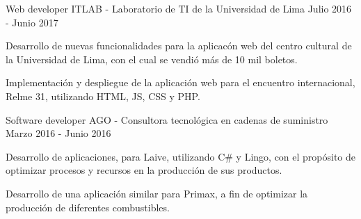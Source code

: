 \begin{cventries}
  \cventry
    {Web developer} %
    {ITLAB {\normalfont - Laboratorio de TI de la Universidad de Lima}} %
    {} %
    {Julio 2016 - Junio 2017} %
    {
      \begin{cvitems} %
        \item {Desarrollo de nuevas funcionalidades para la aplicacón web del centro cultural de la Universidad de Lima, con el cual se vendió más de 10 mil boletos.}
        \item {Implementación y despliegue de la aplicación web para el encuentro internacional, Relme 31, utilizando HTML, JS, CSS y PHP.}
      \end{cvitems}
    }

  \cventry
    {Software developer} %
    {AGO {\normalfont - Consultora tecnológica en cadenas de suministro}} %
    {} %
    {Marzo 2016 - Junio 2016} %
    {
      \begin{cvitems} %
        \item {Desarrollo de aplicaciones, para Laive, utilizando C\# y Lingo, con el propósito de optimizar procesos y recursos en la producción de sus productos.}
        \item {Desarrollo de una aplicación similar para Primax, a fin de optimizar la producción de diferentes combustibles.}
      \end{cvitems}
    }

\end{cventries}
